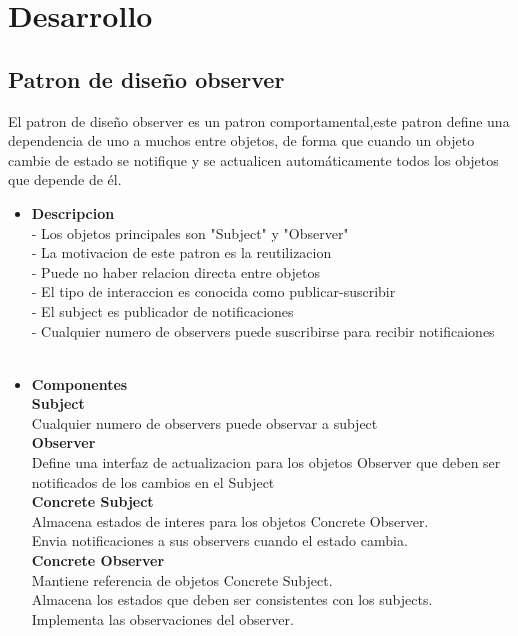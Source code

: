 \documentclass[twoside,twocolumn]{article}
\begin{document}
\section{Desarrollo}

\subsection{Patron de diseño observer}

El patron de diseño observer es un patron comportamental,este patron define 
una dependencia de uno a muchos entre objetos, de forma que cuando un objeto 
cambie de estado se notifique y se actualicen automáticamente todos los
 objetos que depende de él.
 \begin{itemize}
 \item  \textbf{Descripcion}
 \\ {- Los objetos principales son "Subject" y "Observer"}
 \\ {- La motivacion de este patron es la reutilizacion}
 \\ {- Puede no haber relacion directa entre objetos}
 \\ {- El tipo de interaccion es conocida como publicar-suscribir}
 \\ {- El subject es publicador de notificaciones}
 \\ {- Cualquier numero de observers puede suscribirse para recibir notificaiones}
\\
\\
 \item  \textbf{Componentes}
 \\ \textbf{Subject}
 \\Cualquier numero de observers puede observar a subject
 \\ \textbf{Observer}
 \\Define  una interfaz de actualizacion para los objetos Observer que deben ser notificados de los cambios en el Subject
 \\ \textbf{Concrete Subject}
 \\Almacena estados de interes  para  los objetos Concrete Observer.
 \\Envia notificaciones a sus observers cuando el estado cambia.
\\ \textbf{Concrete Observer}
\\Mantiene referencia  de objetos Concrete Subject.
\\Almacena los estados que deben ser consistentes con los subjects.
\\Implementa las observaciones del observer.

\end{itemize}
\end{document}
